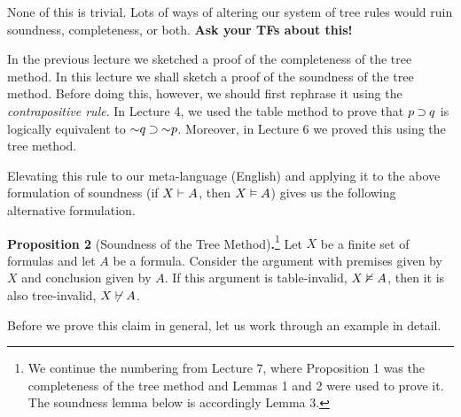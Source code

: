 \documentclass[options]{philosophersimprint}
\begin{document}
None of this is trivial. Lots of ways of altering our system of tree rules would ruin soundness, completeness, or both. \textbf{Ask your TFs about this!}

In the previous lecture we sketched a proof of the completeness of the tree method. In this lecture we shall sketch a proof of the soundness of the tree method. Before doing this, however, we should first rephrase it using the \textit{contrapositive rule}. In Lecture 4, we used the table method to prove that $p\mathbin{\supset} q$ is logically equivalent to $\mathord{\sim} q\mathbin{\supset} \mathord{\sim} p$. Moreover, in Lecture 6 we proved this using the tree method.

Elevating this rule to our meta-language (English) and applying it to the above formulation of soundness (if $X \vdash A$, then $X \vDash A$) gives us the following alternative formulation.

\textbf{Proposition 2} (Soundness of the Tree Method)\textbf{.}\footnote{We continue the numbering from Lecture 7, where Proposition 1 was the completeness of the tree method and Lemmas 1 and 2 were used to prove it. The soundness lemma below is accordingly Lemma 3.} Let $X$ be a finite set of formulas and let $A$ be a formula. Consider the argument with premises given by $X$ and conclusion given by $A$. If this argument is table-invalid, $X \nvDash A$, then it is also tree-invalid, $X \not\vdash A$.

Before we prove this claim in general, let us work through an example in detail.
\end{document}
